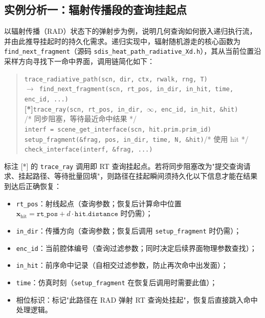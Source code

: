 \subsection{实例分析一：辐射传播段的查询挂起点}

以辐射传播（RAD）状态下的弹射步为例，说明几何查询如何嵌入递归执行流，并由此推导挂起时的持久化需求。递归实现中，辐射随机游走的核心函数为 \texttt{find\_next\_fragment}（源码 \texttt{sdis\_heat\_path\_radiative\_Xd.h}），其从当前位置沿采样方向寻找下一命中界面，调用链简化如下：

\begin{quote}\small
\texttt{trace\_radiative\_path(scn, dir, ctx, rwalk, rng, T)}\\
\hspace*{1.5em}\texttt{$\rightarrow$ find\_next\_fragment(scn,\,rt\_pos,\,in\_dir,\,in\_hit,\,time,\,enc\_id,\,...)}\\
\hspace*{3em}\textbf{[*]}\;\texttt{trace\_ray(scn,\,rt\_pos,\,in\_dir,\,$\infty$,\,enc\_id,\,in\_hit,\,\&hit)}\\
\hspace*{5em}/* 同步阻塞，等待最近命中结果 */\\
\hspace*{3em}\texttt{interf = scene\_get\_interface(scn, hit.prim.prim\_id)}\\
\hspace*{3em}\texttt{setup\_fragment(\&frag,\,pos,\,in\_dir,\,time,\,N,\,\&hit)}\quad/* 使用 hit */\\
\hspace*{3em}\texttt{check\_interface(interf, \&frag, ...)}
\end{quote}

标注 [*] 的 \texttt{trace\_ray} 调用即 RT 查询挂起点。若将同步阻塞改为"提交查询请求、挂起路径、等待批量回填"，则路径在挂起瞬间须持久化以下信息才能在结果到达后正确恢复：
\begin{itemize}[nosep]
  \item \texttt{rt\_pos}：射线起点（查询参数；恢复后计算命中位置 $\mathbf{x}_\text{hit} = \texttt{rt\_pos} + d\cdot\texttt{hit.distance}$ 时仍需）；
  \item \texttt{in\_dir}：传播方向（查询参数；恢复后调用 \texttt{setup\_fragment} 时仍需）；
  \item \texttt{enc\_id}：当前腔体编号（查询过滤参数；同时决定后续界面物理参数查找）；
  \item \texttt{in\_hit}：前序命中记录（自相交过滤参数，防止再次命中出发面）；
  \item \texttt{time}：仿真时刻（\texttt{setup\_fragment} 在恢复后调用时需要此值）；
  \item 相位标识：标记"此路径在 RAD 弹射 RT 查询处挂起"，恢复后直接跳入命中处理逻辑。
\end{itemize}

